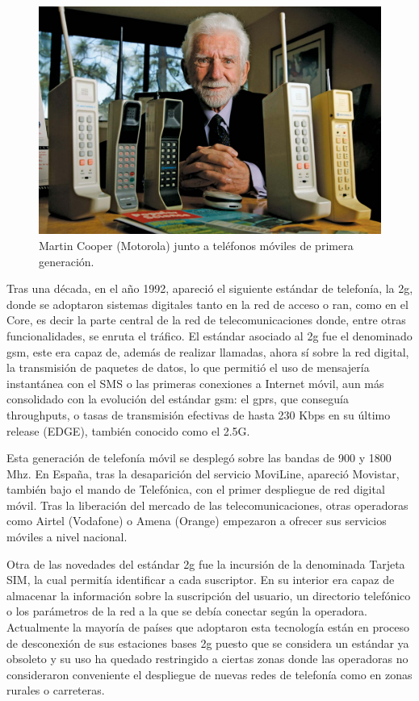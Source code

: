 \begin{figure}[h]
    \centering
        \includegraphics[width=15cm]{archivos/motorola}
        \caption{Martin Cooper (Motorola) junto a teléfonos móviles de primera generación. \cite{Huffaker2009}}
        \label{fig:motorola}
\end{figure}

\par Tras una década, en el año 1992, apareció el siguiente estándar de telefonía, la \gls{2g}, donde se adoptaron sistemas digitales tanto en la red de acceso o \gls{ran}, como en el Core, es decir la parte central de la red de telecomunicaciones donde, entre otras funcionalidades, se enruta el tráfico.
El estándar asociado al \gls{2g} fue el denominado \gls{gsm}, este era capaz de, además de realizar llamadas, ahora sí sobre la red digital, la transmisión de paquetes de datos, lo que permitió el uso de mensajería instantánea con el SMS o las primeras conexiones a Internet móvil, aun más consolidado con la evolución del estándar \gls{gsm}: el \gls{gprs}, que conseguía throughputs, o tasas de transmisión efectivas de hasta 230 Kbps en su último release (EDGE), también conocido como el 2.5G. \cite{LaCuevaGSM2014} 
\\
\par Esta generación de telefonía móvil se desplegó sobre las bandas de 900 y 1800 Mhz. En España, tras la desaparición del servicio MoviLine, apareció Movistar, también bajo el mando de Telefónica, con el primer despliegue de red digital móvil. Tras la liberación del mercado de las telecomunicaciones, otras operadoras como Airtel (Vodafone) o Amena (Orange) empezaron a ofrecer sus servicios móviles a nivel nacional. \cite{Wikipedia2019b}
\\
\par Otra de las novedades del estándar \gls{2g} fue la incursión de la denominada Tarjeta SIM, la cual permitía identificar a cada suscriptor. En su interior era capaz de almacenar la información sobre la suscripción del usuario, un directorio telefónico o los parámetros de la red a la que se debía conectar según la operadora. Actualmente la mayoría de países que adoptaron esta tecnología están en proceso de desconexión de sus estaciones bases \gls{2g} puesto que se considera un estándar ya obsoleto y su uso ha quedado restringido a ciertas zonas donde las operadoras no consideraron conveniente el despliegue de nuevas redes de telefonía como en zonas rurales o carreteras. \cite{Wikipedia2019b}
